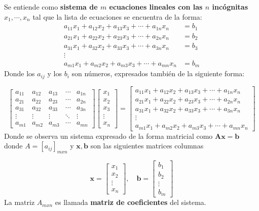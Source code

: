 \begin{defi}\citep{Blyth_2002}
    Se entiende como \textbf{sistema de $m$ ecuaciones lineales con las $n$ incógnitas} $x_1,\cdots,x_n$ tal que la lista de ecuaciones se encuentra de la forma:
    \begin{align*}
a_{11}x_1 + a_{12}x_2 + a_{13}x_3 + \cdots + a_{1n}x_n &= b_1 \\
a_{21}x_1 + a_{22}x_2 + a_{23}x_3 + \cdots + a_{2n}x_n &= b_2 \\
a_{31}x_1 + a_{32}x_2 + a_{33}x_3 + \cdots + a_{3n}x_n &= b_3 \\
\vdots \quad \quad \quad \quad \quad \quad \quad \quad \quad \quad \quad \quad \\
a_{m1}x_1 + a_{m2}x_2 + a_{m3}x_3 + \cdots + a_{mn}x_n &= b_m
\end{align*}
Donde los $a_{ij}$ y los $b_i$ son números, expresados también de la siguiente forma:

$$\begin{bmatrix}
a_{11} & a_{12} & a_{13} & \cdots & a_{1n} \\
a_{21} & a_{22} & a_{23} & \cdots & a_{2n} \\
a_{31} & a_{32} & a_{33} & \cdots & a_{3n} \\
\vdots & \vdots & \vdots & \ddots & \vdots \\
a_{m1} & a_{m2} & a_{m3} & \cdots & a_{mn}
\end{bmatrix}
\begin{bmatrix}
x_1 \\
x_2 \\
x_3 \\
\vdots \\
x_n
\end{bmatrix}
=
\begin{bmatrix}
a_{11}x_1 + a_{12}x_2 + a_{13}x_3 + \cdots + a_{1n}x_n \\
a_{21}x_1 + a_{22}x_2 + a_{23}x_3 + \cdots + a_{2n}x_n \\
a_{31}x_1 + a_{32}x_2 + a_{33}x_3 + \cdots + a_{3n}x_n \\
\vdots \\
a_{m1}x_1 + a_{m2}x_2 + a_{m3}x_3 + \cdots + a_{mn}x_n
\end{bmatrix}$$
Donde se observa un sistema expresado de la forma matricial como $\mathbf{Ax=b}$ donde $A={\left[a_{ij} \right]}_{mxn}$ y $\mathbf{x,b}$ son las siguientes matrices columnas

$$\mathbf{x} =
\begin{bmatrix}
x_1 \\
x_2 \\
\vdots \\
x_n
\end{bmatrix}
, \quad
\mathbf{b} =
\begin{bmatrix}
b_1 \\
b_2 \\
\vdots \\
b_m
\end{bmatrix}$$
La matriz $A_{mxn}$ es llamada \textbf{matriz de coeficientes} del sistema.
\end{defi}

